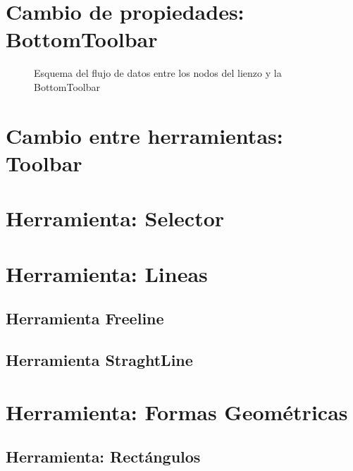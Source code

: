 \newpage
\section{Cambio de propiedades: BottomToolbar}

\begin{figure}[!h]
  \centering
  \noindent{}
  \caption{Esquema del flujo de datos entre los nodos del lienzo y la BottomToolbar}
\end{figure}

\section{Cambio entre herramientas: Toolbar}

\section{Herramienta: Selector}
\section{Herramienta: Lineas}
  \subsection{Herramienta Freeline}
  \subsection{Herramienta StraghtLine}
\section{Herramienta: Formas Geométricas}
  \subsection{Herramienta: Rectángulos}

